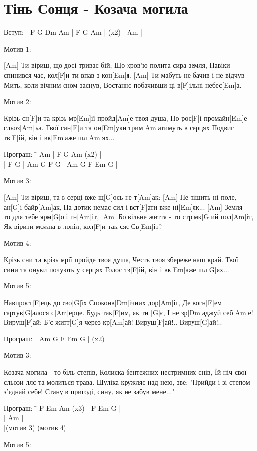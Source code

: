 \section{Тінь Сонця - Козача могила}
\begin{guitar}
Вступ: | F G Dm Am | F G Am | (x2)  | Am |

Мотив 1:

[Am] Ти віриш, що досі триває бій,
Що кров'ю полита сира земля,
Навіки спинився час, кол[F]и ти впав з кон[Em]я.
[Am] Ти мабуть не бачив і не відчув
Мить, коли вічним сном заснув,
Востаннє побачивши ці в[F]ільні небес[Em]а.

Мотив 2:
          
Крізь сн[F]и та крізь мр[Em]ії пройд[Am]е твоя душа,
По рос[F]і промайн[Em]е сльоз[Am]ъа.
Твої син[F]и та он[Em]уки трим[Am]атимуть в серцях
Подвиг тв[F]ій, він і вк[Em]аже шл[Am]ях...
\begin{tabbing}
Програш: \=| Am | F G Am (x2) |\\
         \>| F G | Am G F G | Am G F Em G |\\
\end{tabbing}
\begin{flushleft}
Мотив 3:

[Am] Ти віриш, та в серці вже щ[G]ось не т[Am]ак:
[Am] Не тішить ні поле, ан[G]і байр[Am]ак,
На дотик немає сил і вст[F]ати вже ні[Em]як...
[Am] Земля - то для тебе ярм[G]о і гн[Am]іт,
[Am] Бо вільне життя - то стрімк[G]ий пол[Am]іт,
Як вірити можна в попіл, кол[F]и так сяє Св[Em]іт?

Мотив 4:

Крізь сни та крізь мрії пройде твоя душа,
Честь твоя збереже наш край.
Твої сини та онуки почують у серцях
Голос тв[F]ій, він і вк[Em]аже шл[G]ях...

Мотив 5:

Навпрост[F]ець до сво[G]їх
Споконв[Dm]ічних дор[Am]іг,
Де вогн[F]ем гартув[G]алося с[Am]ерце.
Будь так[F]им, як ти [G]є,
І не зр[Dm]аджуй себ[Am]е!
Вируш[F]ай:
Б'є житт[G]я через кр[Am]ай!
Вируш[F]ай!.. Вируш[G]ай!..

Програш: | Am G F Em G | (x2)

Мотив 3:

Козача могила - то біль степів,
Колиска бентежних нестримних снів,
Їй ніч свої сльози ллє та молиться трава.
Шуліка кружляє над нею, зве:
"Прийди і зі степом з'єднай себе!
Стану в пригоді, сину, як не забув мене..."

\begin{tabbing}
Програш: \=| F Em Am (x3) | F Em G |\\
         \>| Am |\\
         \>|(мотив 3) (мотив 4)\\
\end{tabbing}  
Мотив 5:


\end{flushleft}
\end{guitar}
